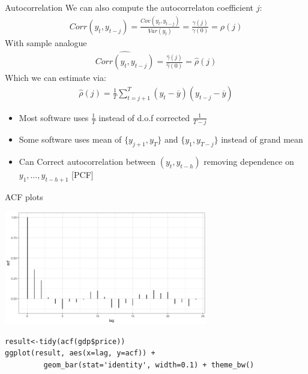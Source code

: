 \documentclass[aspectratio=169]{beamer}
\begin{document}
\begin{frame}{Autocorrelation}
\small
We can also compute the autocorrelaton coefficient $j$: 
\begin{align*}
Corr(y_t,y_{t-j}) = \frac{Cov(y_t,y_{t-j})}{Var(y_t)} = \frac{\gamma(j)}{\gamma(0)} = \rho(j)
\end{align*}
With sample analogue
\begin{align*}
\widehat{Corr(y_t,y_{t-j})} =  \frac{\widehat{\gamma}(j)}{\widehat{\gamma}(0)} = \widehat{\rho}(j)
\end{align*}
Which we can estimate via:
\begin{align*}
\widehat{\rho}(j)=  \frac{1}{T} \sum_{t=j+1}^T(y_t -\overline{y})(y_{t-j} - \overline{y})
\end{align*}
\begin{itemize}
\item Most software uses $\frac{1}{T}$ instead of d.o.f corrected $\frac{1}{T-j}$
\item Some software uses mean of $\{y_{j+1},y_T\}$ and $\{y_{1},y_{T-j}\}$ instead of grand mean
\item Can Correct autocorrelation between $(y_t,y_{t-h})$ removing dependence on $y_1,\ldots , y_{t-h+1}$ [PCF]
\end{itemize}
\end{frame}

\begin{frame}[fragile]{ACF plots}
\begin{center}
\includegraphics[width=3.5in]{./resources/acf_plot.png}
\end{center}
\begin{verbatim}
result<-tidy(acf(gdp$price))
ggplot(result, aes(x=lag, y=acf)) +
         geom_bar(stat='identity', width=0.1) + theme_bw()
\end{verbatim}
\end{frame}
\end{document}
